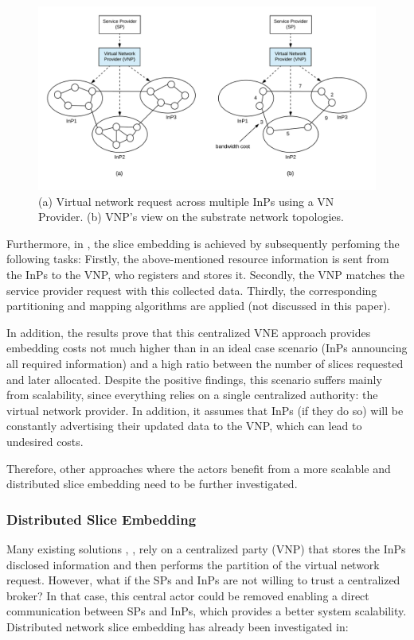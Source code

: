 \begin{figure}
	\centering
	\includegraphics[width=0.9\linewidth]{gfx/multiprov.png}    
  \caption{(a) Virtual network request across multiple InPs using a VN Provider. (b) VNP's view on the substrate network topologies. \citep{dietrich2015multi}}
  \label{fig:multiprov}
\end{figure}

Furthermore, in \citep{dietrich2015multi}, the slice embedding is achieved by subsequently perfoming the following tasks: Firstly, the above-mentioned resource information is sent from the InPs to the VNP, who registers and stores it. Secondly, the VNP matches the service provider request with this collected data. Thirdly, the corresponding partitioning and mapping algorithms are applied (not discussed in this paper). 

In addition, the results prove that this centralized VNE approach provides embedding costs not much higher than in an ideal case scenario (InPs announcing all required information) and a high ratio between the number of slices requested and later allocated. Despite the positive findings, this scenario suffers mainly from scalability, since everything relies on a single centralized authority: the virtual network provider. In addition, it assumes that InPs (if they do so) will be constantly advertising their updated data to the VNP, which can lead to undesired costs.

Therefore, other approaches where the actors benefit from a more scalable and distributed slice embedding need to be further investigated.

\subsubsection{Distributed Slice Embedding}

Many existing solutions \citep{houidi2011virtual}, \citep{dietrich2015multi}, \citep{dietrich2017multi} rely on a centralized party (VNP) that stores the InPs disclosed information and then performs the partition of the virtual network request. However, what if the SPs and InPs are not willing to trust a centralized broker? In that case, this central actor could be removed enabling a direct communication between SPs and InPs, which provides a better system scalability. Distributed network slice embedding has already been investigated in:

